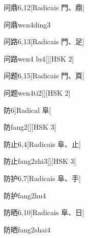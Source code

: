 \begin{entry}{问鼎}{6,12}[Radicais ⾨、⿍]
  \begin{phonetics}{问鼎}{wen4ding3}
  \end{phonetics}
\end{entry}

\begin{entry}{问路}{6,13}[Radicais ⾨、⾜]
  \begin{phonetics}{问路}{wen4 lu4}[][HSK 2]
  \end{phonetics}
\end{entry}

\begin{entry}{问题}{6,15}[Radicais ⾨、⾴]
  \begin{phonetics}{问题}{wen4ti2}[][HSK 2]
  \end{phonetics}
\end{entry}

\begin{entry}{防}{6}[Radical ⾩]
  \begin{phonetics}{防}{fang2}[][HSK 3]
  \end{phonetics}
\end{entry}

\begin{entry}{防止}{6,4}[Radicais ⾩、⽌]
  \begin{phonetics}{防止}{fang2zhi3}[][HSK 3]
  \end{phonetics}
\end{entry}

\begin{entry}{防护}{6,7}[Radicais ⾩、⼿]
  \begin{phonetics}{防护}{fang2hu4}
  \end{phonetics}
\end{entry}

\begin{entry}{防晒}{6,10}[Radicais ⾩、⽇]
  \begin{phonetics}{防晒}{fang2shai4}
  \end{phonetics}
\end{entry}

